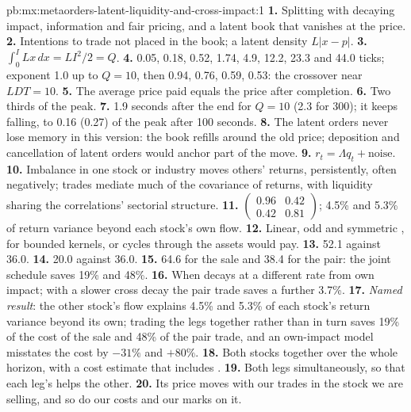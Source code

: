 \begin{solution}{pb:mx:metaorders-latent-liquidity-and-cross-impact:1}
\textbf{1.} Splitting with decaying impact, information and fair pricing, and a latent book that vanishes at the price.
\textbf{2.} Intentions to trade not placed in the book; a latent density $L|x-p|$.
\textbf{3.} $\int_0^ILx\,dx=LI^2/2=Q$.
\textbf{4.} 0.05, 0.18, 0.52, 1.74, 4.9, 12.2, 23.3 and 44.0 ticks; exponent 1.0 up to $Q=10$, then 0.94, 0.76, 0.59, 0.53: the crossover near $LDT=10$.
\textbf{5.} The average price paid equals the price after completion.
\textbf{6.} Two thirds of the peak.
\textbf{7.} 1.9 seconds after the end for $Q=10$ (2.3 for 300); it keeps falling, to 0.16 (0.27) of the peak after 100 seconds.
\textbf{8.} The latent orders never lose memory in this version: the book refills around the old price; deposition and cancellation of latent orders
would anchor part of the move.
\textbf{9.} $r_t=\Lambda q_t+\text{noise}$.
\textbf{10.} Imbalance in one stock or industry moves others' returns, persistently, often negatively; trades mediate much of the covariance of returns,
with liquidity sharing the correlations' sectorial structure.
\textbf{11.} $\begin{pmatrix}0.96&0.42\\0.42&0.81\end{pmatrix}$; 4.5\% and 5.3\% of return variance beyond each stock's own flow.
\textbf{12.} Linear, odd and symmetric , for bounded kernels, or cycles through the assets would pay.
\textbf{13.} 52.1 against 36.0.
\textbf{14.} 20.0 against 36.0.
\textbf{15.} 64.6 for the sale and 38.4 for the pair: the joint schedule saves 19\% and 48\%.
\textbf{16.} When  decays at a different rate from own impact; with a slower cross decay the pair trade saves a further 3.7\%.
\textbf{17.} \emph{Named result}: the other stock's flow explains 4.5\% and 5.3\% of each stock's return variance beyond its own; trading the legs together
rather than in turn saves 19\% of the cost of the sale and 48\% of the pair trade, and an own-impact model misstates the cost by $-31\%$ and $+80\%$.
\textbf{18.} Both stocks together over the whole horizon, with a cost estimate that includes .
\textbf{19.} Both legs simultaneously, so that each leg's  helps the other.
\textbf{20.} Its price moves with our trades in the stock we are selling, and so do our costs and our marks on it.
\end{solution}

